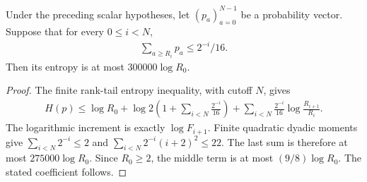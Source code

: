 \begin{lemma}
    \label{thm:aklv_sequence_finite_entropy}
    \leanok
    Under the preceding scalar hypotheses, let $(p_a)_{a=0}^{N-1}$
    be a probability vector. Suppose that for every $0\le i<N$,
    \begin{align*}
        \sum_{a\ge R_i}p_a\le2^{-i}/16.
    \end{align*}
    Then its entropy is at most $300000\log R_0$.
\end{lemma}
\begin{proof}
    \leanok
    The finite rank-tail entropy inequality, with cutoff $N$, gives
    \begin{align*}
        H(p)\le\log R_0+
        \log2\left(1+\sum_{i<N}\frac{2^{-i}}{16}\right)+
        \sum_{i<N}\frac{2^{-i}}{16}\log\frac{R_{i+1}}{R_i}.
    \end{align*}
    The logarithmic increment is exactly $\log F_{i+1}$.
    Finite quadratic dyadic moments give
    $\sum_{i<N}2^{-i}\le2$ and
    $\sum_{i<N}2^{-i}(i+2)^2\le22$.
    The last sum is therefore at most $275000\log R_0$.
    Since $R_0\ge2$, the middle term is at most
    $(9/8)\log R_0$. The stated coefficient follows.
\end{proof}

